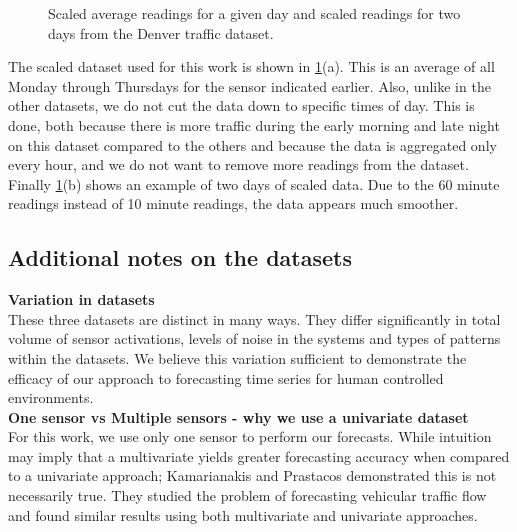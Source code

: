 \begin{figure}[h]
	\begin{center}
	\end{center}
	\caption{Scaled average readings for a given day and scaled readings for two days from the Denver traffic dataset.}
	\label{fig:denver_scaled}
\end{figure}

The scaled dataset used for this work is shown in \ref{fig:denver_scaled}(a).  This is an average of all Monday through Thursdays for the sensor indicated earlier.  Also, unlike in the other datasets, we do not cut the data down to specific times of day.  This is done, both because there is more traffic during the early morning and late night on this dataset compared to the others and because the data is aggregated only every hour, and we do not want to remove more readings from the dataset.  Finally \ref{fig:denver_scaled}(b) shows an example of two days of scaled data.  Due to the 60 minute readings instead of 10 minute readings, the data appears much smoother.  


\subsection{Additional notes on the datasets} 

\noindent
\textbf{Variation in datasets} \\
These three datasets are distinct in many ways.  They differ significantly in total volume of sensor activations, levels of noise in the systems and types of patterns within the datasets.  We believe this variation sufficient to demonstrate the efficacy of our approach to forecasting time series for human controlled environments. \\

\noindent
\textbf{One sensor vs Multiple sensors - why we use a univariate dataset} \\
For this work, we use only one sensor to perform our forecasts.  While intuition may imply that a multivariate yields greater forecasting accuracy when compared to a univariate approach; Kamarianakis and Prastacos \cite{Kamarianakis2003} demonstrated this is not necessarily true.  They studied the problem of forecasting vehicular traffic flow and found similar results using both multivariate and univariate approaches.

